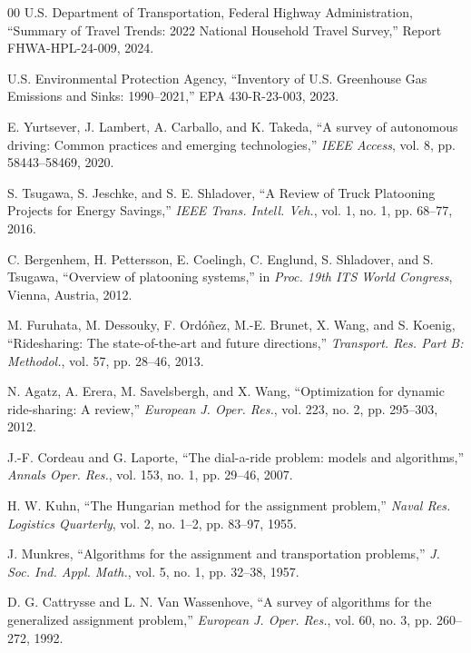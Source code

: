 \documentclass[conference]{IEEEtran}
\begin{document}
\begin{thebibliography}{00}
 U.S. Department of Transportation, Federal Highway Administration, ``Summary of Travel Trends: 2022 National Household Travel Survey,'' Report FHWA-HPL-24-009, 2024.

 U.S. Environmental Protection Agency, ``Inventory of U.S. Greenhouse Gas Emissions and Sinks: 1990--2021,'' EPA 430-R-23-003, 2023.

 E. Yurtsever, J. Lambert, A. Carballo, and K. Takeda, ``A survey of autonomous driving: Common practices and emerging technologies,'' \textit{IEEE Access}, vol. 8, pp. 58443--58469, 2020.

 S. Tsugawa, S. Jeschke, and S. E. Shladover, ``A Review of Truck Platooning Projects for Energy Savings,'' \textit{IEEE Trans. Intell. Veh.}, vol. 1, no. 1, pp. 68--77, 2016.

 C. Bergenhem, H. Pettersson, E. Coelingh, C. Englund, S. Shladover, and S. Tsugawa, ``Overview of platooning systems,'' in \textit{Proc. 19th ITS World Congress}, Vienna, Austria, 2012.

 M. Furuhata, M. Dessouky, F. Ord\'{o}\~{n}ez, M.-E. Brunet, X. Wang, and S. Koenig, ``Ridesharing: The state-of-the-art and future directions,'' \textit{Transport. Res. Part B: Methodol.}, vol. 57, pp. 28--46, 2013.

 N. Agatz, A. Erera, M. Savelsbergh, and X. Wang, ``Optimization for dynamic ride-sharing: A review,'' \textit{European J. Oper. Res.}, vol. 223, no. 2, pp. 295--303, 2012.

 J.-F. Cordeau and G. Laporte, ``The dial-a-ride problem: models and algorithms,'' \textit{Annals Oper. Res.}, vol. 153, no. 1, pp. 29--46, 2007.

 H. W. Kuhn, ``The Hungarian method for the assignment problem,'' \textit{Naval Res. Logistics Quarterly}, vol. 2, no. 1--2, pp. 83--97, 1955.

 J. Munkres, ``Algorithms for the assignment and transportation problems,'' \textit{J. Soc. Ind. Appl. Math.}, vol. 5, no. 1, pp. 32--38, 1957.

 D. G. Cattrysse and L. N. Van Wassenhove, ``A survey of algorithms for the generalized assignment problem,'' \textit{European J. Oper. Res.}, vol. 60, no. 3, pp. 260--272, 1992.


\end{thebibliography}
\end{document}
